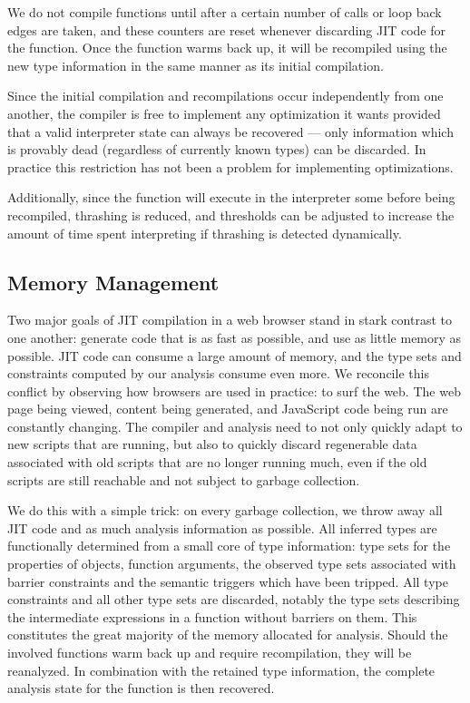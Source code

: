 We do not compile functions until after a certain number of calls or loop back
edges are taken, and these counters are reset whenever discarding JIT code
for the function.
Once the function warms back up, it will be recompiled using the new type information
in the same manner as its initial compilation.

Since the initial compilation and recompilations occur independently
from one another, the compiler is free to implement any optimization it
wants provided that a valid interpreter state can always be recovered ---
only information which is provably dead (regardless of currently known types)
can be discarded.
In practice this restriction has not been a problem for
implementing optimizations.

Additionally, since the function will execute in the interpreter some before
being recompiled, thrashing is reduced, and thresholds can be adjusted to
increase the amount of time spent interpreting if thrashing is detected
dynamically.

\subsection{Memory Management}
\label{sec:memory}

Two major goals of JIT compilation in a web browser stand in stark contrast
to one another: generate code that is as fast as possible, and use as little
memory as possible.
JIT code can consume a large amount of memory, and the type sets and constraints
computed by our analysis consume even more.
We reconcile this conflict by observing how browsers are used in practice:
to surf the web.
The web page being viewed, content being generated, and JavaScript code being
run are constantly changing.
The compiler and analysis need to not only quickly adapt to new scripts that are
running, but also to quickly discard regenerable data associated with
old scripts that are no longer running much, even if the old scripts are still
reachable and not subject to garbage collection.

We do this with a simple trick:
on every garbage collection, we throw away all JIT code and as much analysis
information as possible.
All inferred types are functionally determined from a small core of type
information:
type sets for the properties of objects, function arguments, the observed
type sets associated with barrier constraints and the semantic triggers which
have been tripped.
All type constraints and all other type sets are discarded, notably the type sets
describing the intermediate expressions in a function without barriers on them.
This constitutes the great majority of the memory allocated for analysis.
Should the involved functions warm back up and require recompilation,
they will be reanalyzed. In combination with the retained type information,
the complete analysis state for the function is then recovered.

